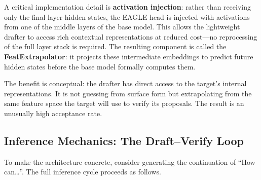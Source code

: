 \documentclass[11pt,a4paper]{article}
\theoremstyle{definition}
\theoremstyle{remark}
\theoremstyle{plain}
\begin{document}
A critical implementation detail is \textbf{activation injection}: rather
than receiving only the final-layer hidden states, the EAGLE head is
injected with activations from one of the middle layers of the base model.
This allows the lightweight drafter to access rich contextual
representations at reduced cost---no reprocessing of the full layer stack
is required. The resulting component is called the
\textbf{FeatExtrapolator}: it projects these intermediate embeddings to
predict future hidden states before the base model formally computes them.

The benefit is conceptual: the drafter has direct access to the target's
internal representations. It is not guessing from surface form but
extrapolating from the same feature space the target will use to verify
its proposals. The result is an unusually high acceptance rate.

\subsection{Inference Mechanics: The Draft--Verify Loop}

To make the architecture concrete, consider generating the continuation of
``How can\ldots''. The full inference cycle proceeds as follows.
\end{document}
